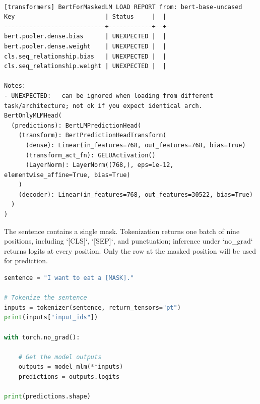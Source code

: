\documentclass[../labs.tex]{subfiles}
\begin{document}
\hypertarget{out:lab03-bert-c16}{}\label{out:lab03-bert-c16}

\begin{lstlisting}[style=terminalOutput,breakatwhitespace=false,columns=fullflexible]

[transformers] BertForMaskedLM LOAD REPORT from: bert-base-uncased
Key                         | Status     |  |
----------------------------+------------+--+-
bert.pooler.dense.bias      | UNEXPECTED |  |
bert.pooler.dense.weight    | UNEXPECTED |  |
cls.seq_relationship.bias   | UNEXPECTED |  |
cls.seq_relationship.weight | UNEXPECTED |  |

Notes:
- UNEXPECTED:	can be ignored when loading from different task/architecture; not ok if you expect identical arch.
BertOnlyMLMHead(
  (predictions): BertLMPredictionHead(
    (transform): BertPredictionHeadTransform(
      (dense): Linear(in_features=768, out_features=768, bias=True)
      (transform_act_fn): GELUActivation()
      (LayerNorm): LayerNorm((768,), eps=1e-12, elementwise_affine=True, bias=True)
    )
    (decoder): Linear(in_features=768, out_features=30522, bias=True)
  )
)

\end{lstlisting}


The sentence contains a single mask. Tokenization returns one batch of nine positions, including `[CLS]`, `[SEP]`, and punctuation; inference under `no\_grad` returns logits at every position. Only the row at the masked position will be used for prediction.


\begin{lstlisting}[language=Python,basicstyle=\ttfamily\scriptsize,breaklines=true,breakatwhitespace=false,columns=fullflexible,keepspaces=true,numbers=none]
sentence = "I want to eat a [MASK]."

# Tokenize the sentence
inputs = tokenizer(sentence, return_tensors="pt")
print(inputs["input_ids"])

with torch.no_grad():
    
    # Get the model outputs 
    outputs = model_mlm(**inputs)
    predictions = outputs.logits

print(predictions.shape)
\end{lstlisting}

\hypertarget{out:lab03-bert-c17}{}\label{out:lab03-bert-c17}
\end{document}
